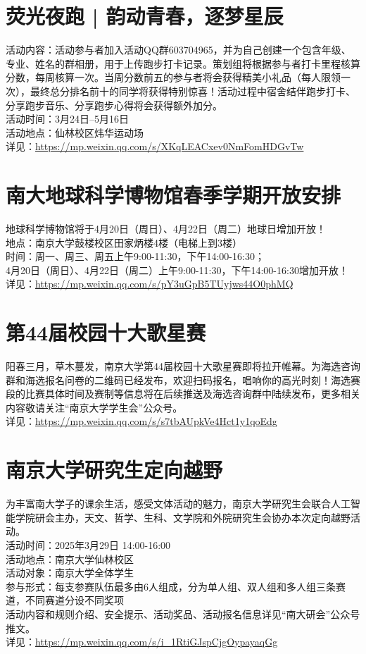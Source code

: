 \documentclass[letterpaper, 12pt]{article}
\begin{document}
\begin{multicols}{2}
\section{荧光夜跑 | 韵动青春，逐梦星辰}
活动内容：活动参与者加入活动QQ群603704965，并为自己创建一个包含年级、专业、姓名的群相册，用于上传跑步打卡记录。策划组将根据参与者打卡里程核算分数，每周核算一次。当周分数前五的参与者将会获得精美小礼品（每人限领一次），最终总分排名前十的同学将获得特别惊喜！活动过程中宿舍结伴跑步打卡、分享跑步音乐、分享跑步心得将会获得额外加分。
\\活动时间：3月24日--5月16日
\\活动地点：仙林校区炜华运动场
\\详见：\url{https://mp.weixin.qq.com/s/XKqLEACxev0NmFomHDGvTw}

\section{南大地球科学博物馆春季学期开放安排}
地球科学博物馆将于4月20日（周日）、4月22日（周二）地球日增加开放！
\\地点：南京大学鼓楼校区田家炳楼4楼（电梯上到3楼）
\\时间：周一、周三、周五上午9:00-11:30，下午14:00-16:30；
\\4月20日（周日）、4月22日（周二）上午9:00-11:30，下午14:00-16:30增加开放！
\\详见：\url{https://mp.weixin.qq.com/s/pY3uGpB5TUyjws44O0phMQ}

\section{第44届校园十大歌星赛}
阳春三月，草木蔓发，南京大学第44届校园十大歌星赛即将拉开帷幕。为海选咨询群和海选报名问卷的二维码已经发布，欢迎扫码报名，唱响你的高光时刻！海选赛段的比赛具体时间及赛制等信息将在后续推送及海选咨询群中陆续发布，更多相关内容敬请关注“南京大学学生会”公众号。
\\详见：\url{https://mp.weixin.qq.com/s/s7tbAUpkVe4Hct1y1qoEdg}

\section{南京大学研究生定向越野}
为丰富南大学子的课余生活，感受文体活动的魅力，南京大学研究生会联合人工智能学院研会主办，天文、哲学、生科、文学院和外院研究生会协办本次定向越野活动。
\\活动时间：2025年3月29日 14:00-16:00
\\活动地点：南京大学仙林校区
\\活动对象：南京大学全体学生
\\参与形式：每支参赛队伍最多由6人组成，分为单人组、双人组和多人组三条赛道，不同赛道分设不同奖项
\\活动内容和规则介绍、安全提示、活动奖品、活动报名信息详见“南大研会”公众号推文。
\\详见：\url{https://mp.weixin.qq.com/s/i_1RtiGJspCjgOypayaqGg}


\end{multicols}
\end{document}
